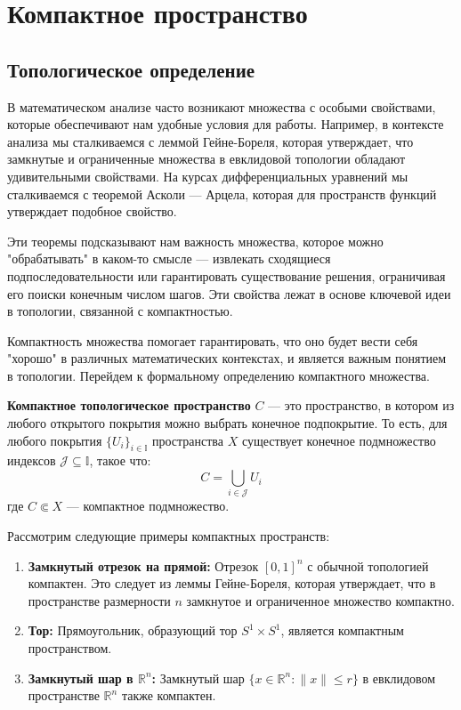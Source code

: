 \section{Компактное пространство}
\subsection{Топологическое определение}

В математическом анализе часто возникают множества с особыми свойствами, которые обеспечивают нам удобные условия для работы. Например, в контексте анализа мы сталкиваемся с леммой Гейне-Бореля, которая утверждает, что замкнутые и ограниченные множества в евклидовой топологии обладают удивительными свойствами. На курсах дифференциальных уравнений мы сталкиваемся с теоремой Асколи — Арцела, которая для пространств функций утверждает подобное свойство.

Эти теоремы подсказывают нам важность множества, которое можно "обрабатывать" в каком-то смысле — извлекать сходящиеся подпоследовательности или гарантировать существование решения, ограничивая его поиски конечным числом шагов. Эти свойства лежат в основе ключевой идеи в топологии, связанной с компактностью.

Компактность множества помогает гарантировать, что оно будет вести себя "хорошо" в различных математических контекстах, и является важным понятием в топологии. Перейдем к формальному определению компактного множества.

\begin{definition}[Компакт]
	\textbf{Компактное топологическое пространство} \( C \) — это пространство, в котором из любого открытого покрытия можно выбрать конечное подпокрытие. То есть, для любого покрытия \( \{ U_i \}_{i \in \mathbb{I}} \) пространства \( X \) существует конечное подмножество индексов \( \mathcal{J} \subseteq \mathbb{I} \), такое что:
	\begin{equation*}
		C = \bigcup_{i \in \mathcal{J}} U_i
	\end{equation*}
	где \( C \Subset X \) — компактное подмножество.
\end{definition}


\begin{example}
	Рассмотрим следующие примеры компактных пространств:
	\begin{enumerate}
		\item \textbf{Замкнутый отрезок на прямой:} Отрезок \( [0,1]^n \) с обычной топологией компактен. Это следует из леммы Гейне-Бореля, которая утверждает, что в пространстве размерности \( n \) замкнутое и ограниченное множество компактно.
		\item \textbf{Тор:} Прямоугольник, образующий тор \( S^1 \times S^1 \), является компактным пространством.
		
		\item \textbf{Замкнутый шар в \( \mathbb{R}^n \):} Замкнутый шар \( \{x \in \mathbb{R}^n : \|x\| \leq r\} \) в евклидовом пространстве \( \mathbb{R}^n \) также компактен.
	\end{enumerate}
\end{example}


